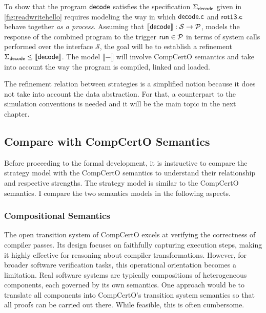 To show that the program $ \mathsf{decode} $
satisfies the specification $\Sigma_{ \mathsf{decode} }$
given in \autoref{fig:readwritehello}
requires modeling the way in which
$ \mathsf{decode.c} $ and $ \mathsf{rot13.c} $ behave together
\emph{as a process}.
Assuming that
$\llbracket  \mathsf{decode}  \rrbracket :
\mathcal{S} \rightarrow \mathcal{P}$,
models the response of the combined program
to the trigger $ \mathsf{run}  \in \mathcal{P}$
in terms of system calls performed over the interface $\mathcal{S}$,
the goal will be to establish a refinement
$
\Sigma_{ \mathsf{decode} }
\le
\llbracket  \mathsf{decode}  \rrbracket
$.
The model $\llbracket - \rrbracket$ will involve CompCertO semantics
and take into account the way the program is
compiled, linked and loaded.

The refinement relation between strategies
is a simplified notion
because it does not take into account
the data abstraction.
For that, a counterpart to the simulation conventions is needed
and it will be the main topic in the next chapter.

\subsection{Compare with CompCertO Semantics}

Before proceeding to the formal development,
it is instructive to compare the strategy model
with the CompCertO semantics to understand their relationship
and respective strengths. The strategy model is
similar to the CompCertO semantics.
I compare the two semantics models
in the following aspects.

\subsubsection{Compositional Semantics}

The open transition system of CompCertO
excels at verifying the correctness of compiler passes.
Its design focuses on faithfully capturing execution steps,
making it highly effective for
reasoning about compiler transformations.
However,
for broader software verification tasks,
this operational orientation becomes a limitation.
Real software systems are typically compositions of heterogeneous components,
each governed by its own semantics.
One approach would be to translate all components
into CompCertO's transition system semantics
so that all proofs can be carried out there.
While feasible, this is often cumbersome.

